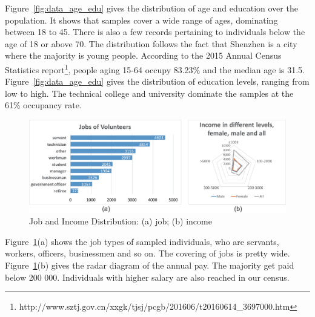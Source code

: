 Figure~\ref{fig:data_age_edu} gives the distribution of age and education over the population. It shows that samples cover a wide range of ages, dominating between 18 to 45. There is also a few records pertaining to individuals below the age of 18 or above 70. The distribution follows the fact that Shenzhen is a city where the majority is young people. According to the 2015 Annual Census Statistics report\footnote{http://www.sztj.gov.cn/xxgk/tjsj/pcgb/201606/t20160614\_3697000.htm}, people aging 15-64 occupy 83.23\% and the median age is 31.5. Figure~\ref{fig:data_age_edu} gives the distribution of education levels, ranging from low to high. The technical college and university dominate the samples at the 61\% occupancy rate.

\begin{figure}[htb!]
 \centering %
 \includegraphics[width=\columnwidth]{pictures/data2}
 \caption{Job and Income Distribution: (a) job; (b) income}
 \label{fig:data_job_inc}
\end{figure}

Figure~\ref{fig:data_job_inc}(a) shows the job types of sampled individuals, who are servants, workers, officers, businessmen and so on. The covering of jobs is pretty wide. Figure~\ref{fig:data_job_inc}(b) gives the radar diagram of the annual pay. The majority get paid below 200 000. Individuals with higher salary are also reached in our census.

